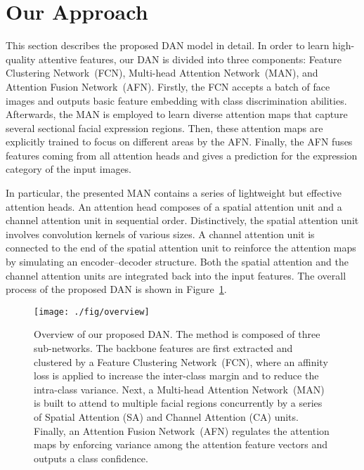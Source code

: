 \documentclass{article}
\begin{document}
\section{Our Approach}
\label{sec:method}
{This section} describes the proposed DAN model in detail.
In order to learn high-quality attentive features, our DAN is divided into three components: Feature Clustering Network~(FCN), Multi-head Attention Network~(MAN), and Attention Fusion Network~(AFN).
Firstly, the FCN accepts a batch of face images and outputs basic feature embedding with class discrimination abilities. Afterwards, the MAN is employed to learn diverse attention maps that capture several sectional facial expression regions. Then, these attention maps are explicitly trained to focus on different areas by the AFN. Finally, the AFN fuses features coming from all attention heads and gives a prediction for the expression category of the input images.

In particular, the presented MAN contains a series of lightweight but effective attention heads. An attention head composes of a spatial attention unit and a channel attention unit in sequential order. Distinctively, the spatial attention unit involves convolution kernels of various sizes. A channel attention unit is connected to the end of the spatial attention unit to reinforce the attention maps by simulating an encoder--decoder structure. Both the spatial attention and the channel attention units are integrated back into the input features. The overall process of the proposed DAN is shown in Figure~\ref{fig:overview}.

\begin{figure}[]
\centering
\texttt{[image: ./fig/overview]}
\caption{{Overview}  of our proposed DAN. The method is composed of three sub-networks. The backbone features are first extracted and clustered by a Feature Clustering Network~(FCN), where an affinity loss is applied to increase the inter-class margin and to reduce the intra-class variance. Next, a Multi-head Attention Network~(MAN) is built to attend to multiple facial regions concurrently by a series of  {Spatial Attention (SA) and Channel Attention (CA)} units. Finally, an Attention Fusion Network~(AFN) regulates the attention maps by enforcing variance among the attention feature vectors and outputs a class confidence.}
\label{fig:overview}
\end{figure}
\end{document}
